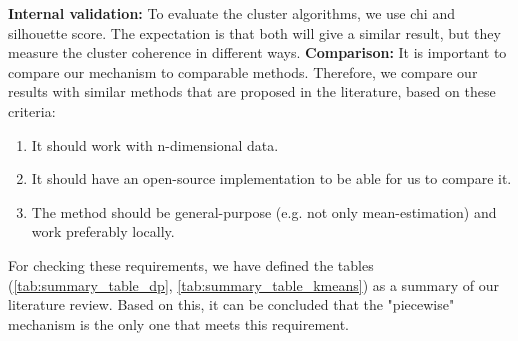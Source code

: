 \textbf{Internal validation:}
To evaluate the cluster algorithms, we use \gls{chi} and silhouette score.
The expectation is that both will give a similar result, but they measure the cluster coherence in different ways. \newline
\textbf{Comparison:}
It is important to compare our mechanism to comparable methods.
Therefore, we compare our results with similar methods that are proposed in the literature, based on these criteria:
\begin{enumerate}
  \item It should work with n-dimensional data.
  \item It should have an open-source implementation to be able for us to compare it.
  \item The method should be general-purpose (e.g. not only mean-estimation) and work preferably locally.
\end{enumerate}
For checking these requirements, we have defined the tables (\ref{tab:summary_table_dp}, \ref{tab:summary_table_kmeans}) as a summary of our literature review.
Based on this, it can be concluded that the "piecewise" mechanism is the only one that meets this requirement.

